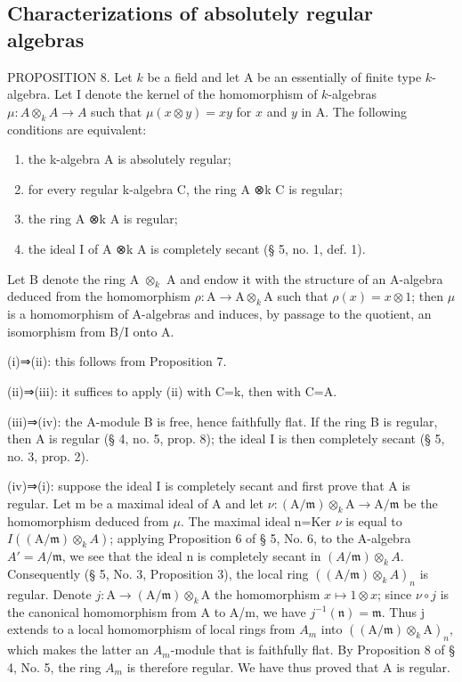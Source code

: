 \subsection{Characterizations of absolutely regular algebras}

PROPOSITION 8. Let \(k\) be a field and let A be an essentially of finite type \(k\)-algebra. Let I denote the kernel of the homomorphism of \(k\)-algebras \(\mu: A \otimes_k A \to A\) such that \(\mu(x \otimes y) = xy\) for \(x\) and \(y\) in A. The following conditions are equivalent:

\begin{enumerate}
\def\labelenumi{(\roman{enumi})}
\item
  the k-algebra A is absolutely regular;
\item
  for every regular k-algebra C, the ring A ⊗k C is regular;
\item
  the ring A ⊗k A is regular;
\item
  the ideal I of A ⊗k A is completely secant (§ 5, no. 1, def. 1).
\end{enumerate}

Let B denote the ring A \(\otimes_{k}\) A and endow it with the structure of an A-algebra deduced from the homomorphism \(\rho: \mathrm{A} \to \mathrm{A} \otimes_{k} \mathrm{A}\) such that \(\rho(x) = x \otimes 1\); then \(\mu\) is a homomorphism of A-algebras and induces, by passage to the quotient, an isomorphism from B/I onto A.

(i)⇒(ii): this follows from Proposition 7.

(ii)⇒(iii): it suffices to apply (ii) with C=k, then with C=A.

(iii)⇒(iv): the A-module B is free, hence faithfully flat. If the ring B is regular, then A is regular (§ 4, no. 5, prop. 8); the ideal I is then completely secant (§ 5, no. 3, prop. 2).

(iv)⇒(i): suppose the ideal I is completely secant and first prove that A is regular. Let m be a maximal ideal of A and let \(\nu:(\mathrm{A}/\mathfrak{m})\otimes_{k}\mathrm{A}\to\mathrm{A}/\mathfrak{m}\) be the homomorphism deduced from \(\mu\). The maximal ideal n=Ker \(\nu\) is equal to \(I((\mathrm{A}/\mathfrak{m})\otimes_{k}A)\); applying Proposition 6 of § 5, No. 6, to the A-algebra \(A'=A/\mathfrak m\), we see that the ideal n is completely secant in \((A/\mathfrak{m})\otimes_{k}A\). Consequently (§ 5, No. 3, Proposition 3), the local ring \(((\mathrm{A}/\mathfrak{m})\otimes_{k}A)_{n}\) is regular. Denote \(j:\mathrm{A}\to(\mathrm{A}/\mathfrak{m})\otimes_{k}\mathrm{A}\) the homomorphism \(x\mapsto1\otimes x\); since \(\nu\circ j\) is the canonical homomorphism from A to A/m, we have \(j^{-1}(\mathfrak{n})=\mathfrak{m}\). Thus j extends to a local homomorphism of local rings from \(A_{m}\) into \(((\mathrm{A}/\mathfrak{m})\otimes_{k}\mathrm{A})_{n}\), which makes the latter an \(A_{m}\)-module that is faithfully flat. By Proposition 8 of § 4, No. 5, the ring \(A_{m}\) is therefore regular. We have thus proved that A is regular.


